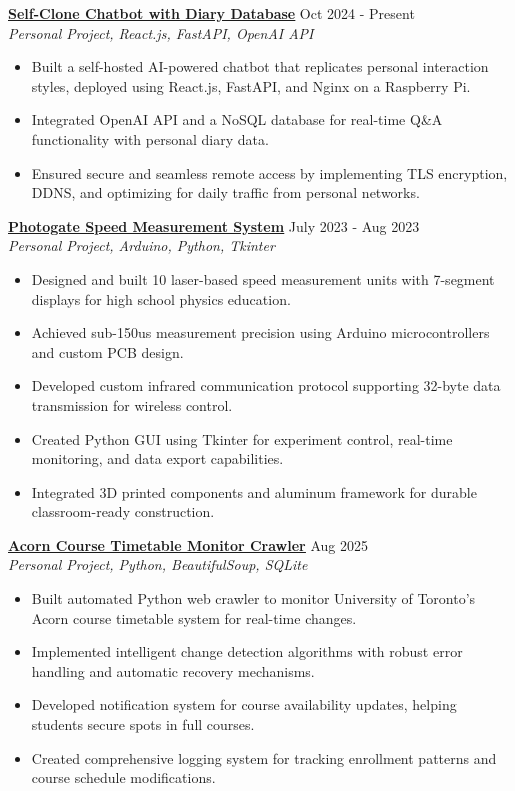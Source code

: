\documentclass[letterpaper,10pt]{article}
\begin{document}
\vspace{0.3cm}
\noindent\href{https://chengyongkang.me/chat}{\uline{
\textbf{Self-Clone Chatbot with Diary Database}}} \hfill Oct 2024 - Present\\
\textit{Personal Project, React.js, FastAPI, OpenAI API}
\begin{itemize}[leftmargin=0.2in]
    \item Built a self-hosted AI-powered chatbot that replicates personal interaction styles, deployed using React.js, FastAPI, and Nginx on a Raspberry Pi.
    \item Integrated OpenAI API and a NoSQL database for real-time Q\&A functionality with personal diary data.
    \item Ensured secure and seamless remote access by implementing TLS encryption, DDNS, and optimizing for daily traffic from personal networks.
\end{itemize}

\vspace{0.3cm}
\noindent\href{https://github.com/Ken-2511/Photogate}{\uline{
\textbf{Photogate Speed Measurement System}}} \hfill July 2023 - Aug 2023\\
\textit{Personal Project, Arduino, Python, Tkinter}
\begin{itemize}[leftmargin=0.2in]
    \item Designed and built 10 laser-based speed measurement units with 7-segment displays for high school physics education.
    \item Achieved sub-150us measurement precision using Arduino microcontrollers and custom PCB design.
    \item Developed custom infrared communication protocol supporting 32-byte data transmission for wireless control.
    \item Created Python GUI using Tkinter for experiment control, real-time monitoring, and data export capabilities.
    \item Integrated 3D printed components and aluminum framework for durable classroom-ready construction.
\end{itemize}

\vspace{0.3cm}
\noindent\href{https://github.com/Ken-2511/AcornCarwler}{\uline{
\textbf{Acorn Course Timetable Monitor Crawler}}} \hfill Aug 2025\\
\textit{Personal Project, Python, BeautifulSoup, SQLite}
\begin{itemize}[leftmargin=0.2in]
    \item Built automated Python web crawler to monitor University of Toronto's Acorn course timetable system for real-time changes.
    \item Implemented intelligent change detection algorithms with robust error handling and automatic recovery mechanisms.
    \item Developed notification system for course availability updates, helping students secure spots in full courses.
    \item Created comprehensive logging system for tracking enrollment patterns and course schedule modifications.
\end{itemize}
\end{document}
